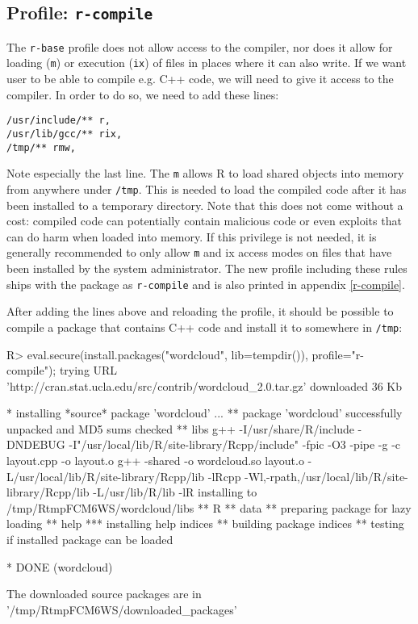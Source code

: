 \documentclass[article]{jss}
\newcommand{\R}{\textsf{R}\xspace}
\newcommand{\Cpp}{\textsf{C++}\xspace}
\begin{document}
\subsection[Profile: r-compile]{Profile: \texttt{r-compile}}

The \texttt{r-base} profile does not allow access to the compiler, nor does it
allow for loading (\texttt{m}) or execution (\texttt{ix}) of files in places
where it can also write. If we want user to be able to compile e.g.
\Cpp code, we will need to give it access to the compiler. In order
to do so, we need to add these lines:

\begin{verbatim}
/usr/include/** r,
/usr/lib/gcc/** rix,
/tmp/** rmw,
\end{verbatim}

Note especially the last line. The \texttt{m} allows \R to load shared
objects into memory from anywhere under \texttt{/tmp}. This is needed to load
the compiled code after it has been installed to a temporary directory. Note
that this does not come without a cost: compiled code can potentially contain
malicious code or even exploits that can do harm when loaded into memory. If
this privilege is not needed, it is generally recommended to only allow
\texttt{m} and {ix} access modes on files that have been installed by the
system administrator. The new profile including these rules ships with the
package as \texttt{r-compile} and is also printed in appendix \ref{r-compile}.

After adding the lines above and reloading the profile, it should be possible to
compile a package that contains \Cpp code and install it to somewhere
in \texttt{/tmp}:

\begin{CodeChunk}
\begin{CodeInput}
R> eval.secure(install.packages("wordcloud", lib=tempdir()), profile="r-compile");
trying URL 'http://cran.stat.ucla.edu/src/contrib/wordcloud_2.0.tar.gz'
downloaded 36 Kb

* installing *source* package 'wordcloud' ...
** package 'wordcloud' successfully unpacked and MD5 sums checked
** libs
g++ -I/usr/share/R/include -DNDEBUG -I"/usr/local/lib/R/site-library/Rcpp/include"
   -fpic  -O3 -pipe  -g  -c layout.cpp -o layout.o
g++ -shared -o wordcloud.so layout.o -L/usr/local/lib/R/site-library/Rcpp/lib
   -lRcpp -Wl,-rpath,/usr/local/lib/R/site-library/Rcpp/lib -L/usr/lib/R/lib -lR
installing to /tmp/RtmpFCM6WS/wordcloud/libs
** R
** data
** preparing package for lazy loading
** help
*** installing help indices
** building package indices
** testing if installed package can be loaded

* DONE (wordcloud)

The downloaded source packages are in
	'/tmp/RtmpFCM6WS/downloaded_packages'
\end{CodeInput}
\end{CodeChunk}
\end{document}
